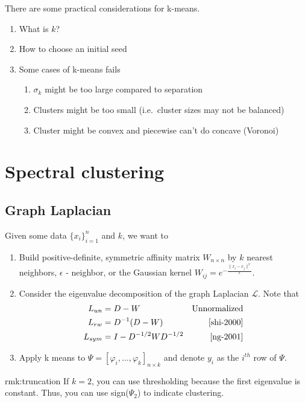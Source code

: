 \documentclass[12pt]{article}
\theoremstyle{plain}
\begin{document}
There are some practical considerations for k-means.
\begin{enumerate}
  \item What is $ k $?
  \item How to choose an initial seed
  \item Some cases of k-means fails
  \begin{enumerate}
    \item $ \sigma_k $ might be too large compared to separation
    \item Clusters might be too small (i.e.\ cluster sizes may not be balanced)
    \item Cluster might be convex and piecewise can't do concave (Voronoi)
  \end{enumerate}
\end{enumerate}

\section{Spectral clustering}
\label{sec:spectral}

\subsection{Graph Laplacian}

Given some data $ \{ x_i \}_{i = 1}^n $ and $ k $, we want to
\begin{enumerate}
  \item Build positive-definite, symmetric affinity matrix $ W_{n \times n} $ by $ k $ nearest neighbors, $ \epsilon $ - neighbor, or the Gaussian kernel $ W_{ij} = e^{- \frac{\| x_i - x_j \|^2}{\epsilon}} $.
  \item Consider the eigenvalue decomposition of the graph Laplacian $ \mathcal{L} $.
  Note that
  \begin{align*}
    L_{un} &= D - W  & \text{Unnormalized} \\
    L_{rw} &= D^{-1} (D - W) & \text{\cite{shi-2000}} \\
    L_{sym} &= I - D^{-1/2} W D^{-1/2} & \text{\cite{ng-2001}}
  \end{align*}
  \item Apply k means to $ \Psi = [\varphi_i, \ldots, \varphi_k]_{n \times k} $ and denote $ y_i $ as the $ i^{th} $ row of $ \Psi $.
\end{enumerate}

\begin{rmk}[Thresholding]{rmk:truncation}
  If $ k = 2$, you can use thresholding because the first eigenvalue is constant. Thus, you can use sign($\Psi_2$) to indicate clustering.
\end{rmk}
\end{document}
